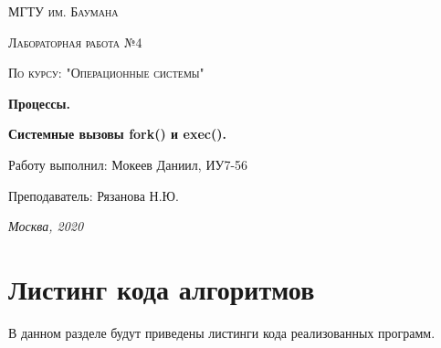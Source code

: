 \documentclass[12pt]{report}
\begin{document}
\begin{titlepage}
	\centering
	{\scshape\LARGE МГТУ им. Баумана \par}
	\vspace{3cm}
	{\scshape\Large Лабораторная работа №4\par}
	\vspace{0.5cm}	
	{\scshape\Large По курсу: "Операционные системы"\par}
	\vspace{1.5cm}
	\centering
	{\huge\bfseries Процессы. \par}
	\centering
	 {\huge\bfseries Системные вызовы fork() и exec().\par}
	\vspace{2cm}
	\Large Работу выполнил: Мокеев Даниил, ИУ7-56\par
	\vspace{0.5cm}
	\Large Преподаватель:  Рязанова Н.Ю.\par

	\vfill
	\large \textit {Москва, 2020} \par
\end{titlepage}


\newpage

\section{Листинг кода алгоритмов}
В данном разделе будут приведены листинги кода реализованных программ. 
\end{document}

